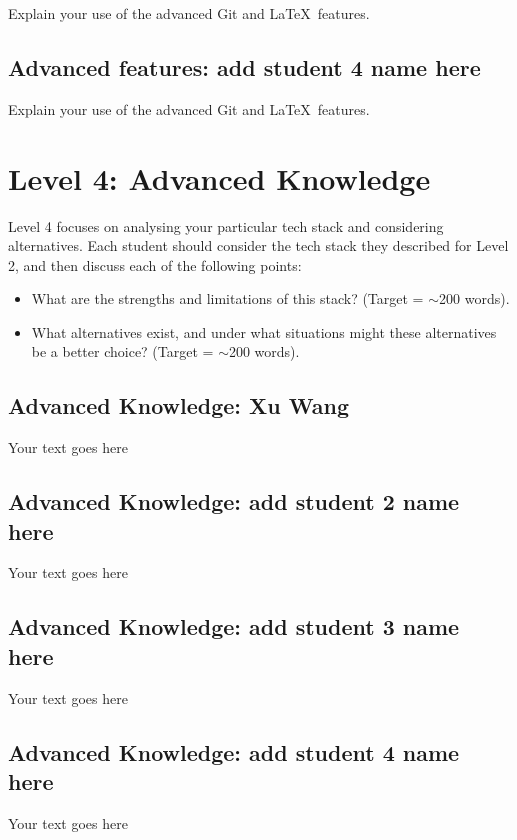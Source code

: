 \documentclass[a4paper, 11pt]{report}
\begin{document}
Explain your use of the advanced Git and \LaTeX\ features. 

\subsection{Advanced features: add student 4 name here}

Explain your use of the advanced Git and \LaTeX\ features. 




\newpage
\section{Level 4: Advanced Knowledge}

Level 4 focuses on analysing your particular tech stack and considering alternatives. Each student should consider the tech stack they described for Level 2, and then discuss each of the following points:
\begin{itemize}
    \item What are the strengths and limitations of this stack? (Target = $\sim$200 words).
    \item What alternatives exist, and under what situations might these alternatives be a better choice? (Target = $\sim$200 words).
\end{itemize}	

\subsection{Advanced Knowledge: Xu Wang}

Your text goes here

\subsection{Advanced Knowledge: add student 2 name here}

Your text goes here

\subsection{Advanced Knowledge: add student 3 name here}

Your text goes here

\subsection{Advanced Knowledge: add student 4 name here}

Your text goes here




\newpage




\end{document}

